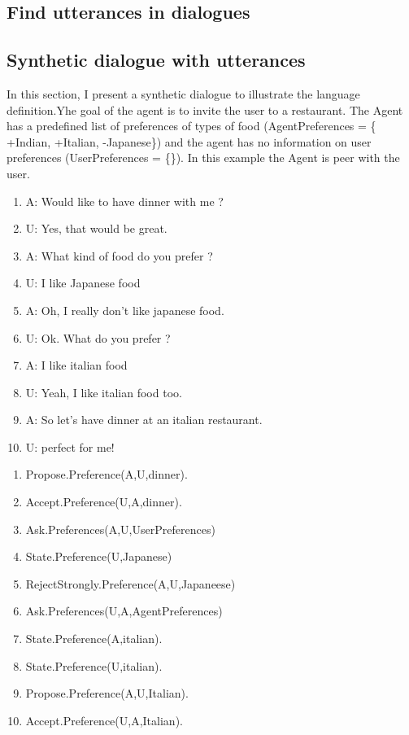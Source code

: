 \documentclass{llncs}
\begin{document}
 \subsection{Find utterances in dialogues}	
 \subsection{Synthetic dialogue with utterances}
 In this section, I present a synthetic dialogue to illustrate the language definition.Yhe goal of the agent is to invite the user to a restaurant. The Agent has a predefined list of preferences of types of food (AgentPreferences = \{ +Indian, +Italian, -Japanese\}) and the agent has no information on user preferences (UserPreferences = \{\}). In this example the Agent is peer with the user. 


\begin{minipage}{0.45\textwidth}
 \begin{enumerate}
	\item A: Would like to have dinner with me ?
	\item U: Yes, that would be great.
	\item A: What kind of food do you prefer ?
	\item U: I like Japanese food
	\item A: Oh, I really don't like japanese food.
	\item U: Ok. What do you prefer ?
	\item A: I like italian food
	\item U: Yeah, I like italian food too.
	\item A: So let's have dinner at an italian restaurant. 
	\item U: perfect for me!
\end{enumerate}
\end{minipage}%
\hfill
\begin{minipage}{0.45\textwidth}
 \begin{enumerate}
	\item Propose.Preference(A,U,dinner).
	\\
	\item Accept.Preference(U,A,dinner).

	\item Ask.Preferences(A,U,UserPreferences)
	\\
	\item State.Preference(U,Japanese)
	\item RejectStrongly.Preference(A,U,Japaneese)
			\\
	\item Ask.Preferences(U,A,AgentPreferences)
	\item State.Preference(A,italian).
	\item State.Preference(U,italian).
	\item Propose.Preference(A,U,Italian).
		\\
	\item Accept.Preference(U,A,Italian).
\end{enumerate}
\end{minipage}%


\noindent 
\vskip 4pt


\end{document}
